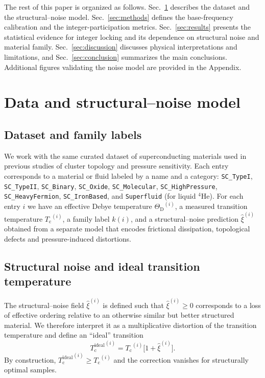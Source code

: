 \documentclass[aps,prb,twocolumn,superscriptaddress,floatfix,nofootinbib]{revtex4-2}
\newcommand{\Tc}{\ensuremath{T_{\mathrm{c}}}}
\newcommand{\Tcone}{\ensuremath{{T_{\mathrm{c}}^{\mathrm{ideal}}}}}
\newcommand{\ThetaD}{\ensuremath{\Theta_{\mathrm{D}}}}
\newcommand{\He}{\ensuremath{\mathrm{He}}}
\newcommand{\HeFour}{\ensuremath{{^{4}\He}}}
\newcommand{\secref}[1]{Sec.~\ref{#1}}
\begin{document}
The rest of this paper is organized as follows.
\secref{sec:data} describes the dataset and the structural--noise model.
\secref{sec:methods} defines the base-frequency calibration
and the integer-participation metrics.
\secref{sec:results} presents the statistical evidence for
integer locking and its dependence on structural noise and material family.
\secref{sec:discussion} discusses physical interpretations and limitations,
and \secref{sec:conclusion} summarizes the main conclusions.
Additional figures validating the noise model are provided in the Appendix.

\section{Data and structural--noise model}
\label{sec:data}

\subsection{Dataset and family labels}

We work with the same curated dataset of superconducting materials
used in previous studies of cluster topology and pressure sensitivity.
Each entry corresponds to a material or fluid labeled by a name and
a category: \texttt{SC\_TypeI}, \texttt{SC\_TypeII}, \texttt{SC\_Binary},
\texttt{SC\_Oxide}, \texttt{SC\_Molecular}, \texttt{SC\_HighPressure},
\texttt{SC\_HeavyFermion}, \texttt{SC\_IronBased}, and \texttt{Superfluid}
(for liquid \HeFour).
For each entry $i$ we have an effective Debye temperature $\ThetaD^{(i)}$,
a measured transition temperature $\Tc^{(i)}$,
a family label $k(i)$, and a structural--noise prediction
$\widehat{\xi}^{(i)}$ obtained from a separate model
that encodes frictional dissipation, topological defects
and pressure-induced distortions.

\subsection{Structural noise and ideal transition temperature}

The structural--noise field $\widehat{\xi}^{(i)}$ is defined such that
$\widehat{\xi}^{(i)} \ge 0$ corresponds to a loss of effective ordering
relative to an otherwise similar but better structured material.
We therefore interpret it as a multiplicative distortion of the
transition temperature and define an ``ideal'' transition
\begin{equation}
  \label{eq:Tc_ideal}
  \Tcone^{(i)} = \Tc^{(i)} \bigl[1 + \widehat{\xi}^{(i)}\bigr].
\end{equation}
By construction, $\Tcone^{(i)} \ge \Tc^{(i)}$ and the correction vanishes
for structurally optimal samples.
\end{document}
